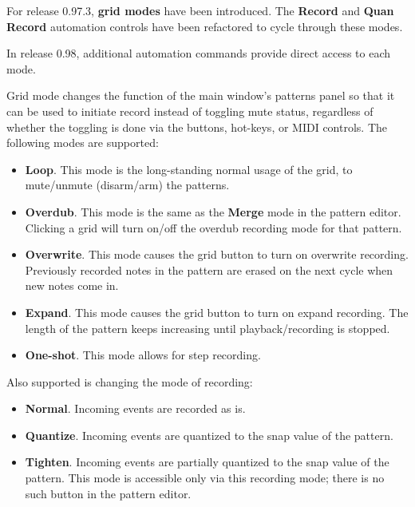    For release 0.97.3,
   \textbf{grid modes} have been introduced.
   The \textbf{Record} and \textbf{Quan Record} automation controls have been
   refactored to cycle through these modes.

   In release 0.98, additional automation commands provide direct access to
   each mode.

   Grid mode changes the function of the main window's patterns panel so that
   it can be used to initiate record instead of toggling mute status,
   regardless of whether the toggling is done via the buttons, hot-keys, or
   MIDI controls.  The following modes are supported:

   \begin{itemize}
      \item \textbf{Loop}.
         This mode is the long-standing normal usage of the grid, to
         mute/unmute (disarm/arm) the patterns.
      \item \textbf{Overdub}.
         This mode is the same as the \textbf{Merge} mode in the pattern
         editor.  Clicking a grid will turn on/off the overdub recording mode
         for that pattern.
      \item \textbf{Overwrite}.
         This mode causes the grid button to turn on overwrite recording.
         Previously recorded notes in the pattern are erased on the next cycle
         when new notes come in.
      \item \textbf{Expand}.
         This mode causes the grid button to turn on expand recording.
         The length of the pattern keeps increasing until playback/recording is
         stopped.
      \item \textbf{One-shot}.
         This mode allows for step recording.
   \end{itemize}

   Also supported is changing the mode of recording:
   \begin{itemize}
      \item \textbf{Normal}.
         Incoming events are recorded as is.
      \item \textbf{Quantize}.
         Incoming events are quantized to the snap value of the pattern.
      \item \textbf{Tighten}.
         Incoming events are partially quantized to the snap value of the
         pattern.  This mode is accessible only via this recording mode; there
         is no such button in the pattern editor.
      \end{itemize}

